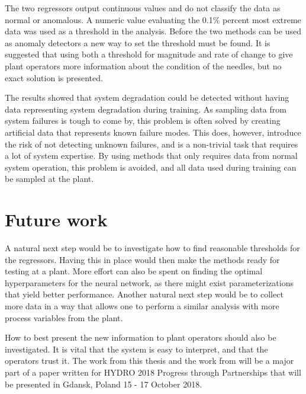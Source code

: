     The two regressors output continuous values and do not classify the data as normal or anomalous. A numeric value evaluating the 0.1\% percent most extreme data was used as a threshold in the analysis. Before the two methods can be used as anomaly detectors a new way to set the threshold must be found. It is suggested that using both a threshold for magnitude and rate of change to give plant operators more information about the condition of the needles, but no exact solution is presented. 
    
    The results showed that system degradation could be detected without having data representing system degradation during training. As sampling data from system failures is tough to come by, this problem is often solved by creating artificial data that represents known failure modes. This does, however, introduce the risk of not detecting unknown failures, and is a non-trivial task that requires a lot of system expertise. By using methods that only requires data from normal system operation, this problem is avoided, and all data used during training can be sampled at the plant. 
    
    
    
\section{Future work}
    A natural next step would be to investigate how to find reasonable thresholds for the regressors. Having this in place would then make the methods ready for testing at a plant. More effort can also be spent on finding the optimal hyperparameters for the neural network, as there might exist parameterizations that yield better performance. Another natural next step would be to collect more data in a way that allows one to perform a similar analysis with more process variables from the plant.

    How to best present the new information to plant operators should also be investigated. It is vital that the system is easy to interpret, and that the operators trust it. The work from this thesis and the work from \cite{Aasnes2017} will be a major part of a paper written for HYDRO 2018 Progress through Partnerships that will be presented in Gdansk, Poland 15 - 17 October 2018. 

    
    
    
       